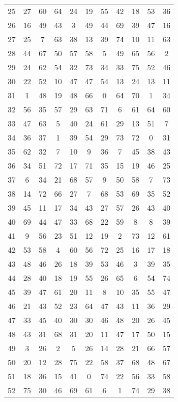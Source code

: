 \begin{table}
\begin{tabular}{c c c c c c c c c c c }
25 & 27 & 60 & 64 & 24 & 19 & 55 & 42 & 18 & 53 & 36 \\
26 & 16 & 49 & 43 & 3 & 49 & 44 & 69 & 39 & 47 & 16 \\
27 & 25 & 7 & 63 & 38 & 13 & 39 & 74 & 10 & 11 & 63 \\
28 & 44 & 67 & 50 & 57 & 58 & 5 & 49 & 65 & 56 & 2 \\
29 & 24 & 62 & 54 & 32 & 73 & 34 & 33 & 75 & 52 & 46 \\
30 & 22 & 52 & 10 & 47 & 47 & 54 & 13 & 24 & 13 & 11 \\
31 & 1 & 48 & 19 & 48 & 66 & 0 & 64 & 70 & 1 & 34 \\
32 & 56 & 35 & 57 & 29 & 63 & 71 & 6 & 61 & 64 & 60 \\
33 & 47 & 63 & 5 & 40 & 24 & 61 & 29 & 13 & 51 & 7 \\
34 & 36 & 37 & 1 & 39 & 54 & 29 & 73 & 72 & 0 & 31 \\
35 & 62 & 32 & 7 & 10 & 9 & 36 & 7 & 45 & 38 & 43 \\
36 & 34 & 51 & 72 & 17 & 71 & 35 & 15 & 19 & 46 & 25 \\
37 & 6 & 34 & 21 & 68 & 57 & 9 & 50 & 58 & 7 & 73 \\
38 & 14 & 72 & 66 & 27 & 7 & 68 & 53 & 69 & 35 & 52 \\
39 & 45 & 11 & 17 & 34 & 43 & 27 & 57 & 26 & 43 & 40 \\
40 & 69 & 44 & 47 & 33 & 68 & 22 & 59 & 8 & 8 & 39 \\
41 & 9 & 56 & 23 & 51 & 12 & 19 & 2 & 73 & 12 & 61 \\
42 & 53 & 58 & 4 & 60 & 56 & 72 & 25 & 16 & 17 & 18 \\
43 & 48 & 46 & 26 & 18 & 39 & 53 & 46 & 3 & 39 & 35 \\
44 & 28 & 40 & 18 & 19 & 55 & 26 & 65 & 6 & 54 & 74 \\
45 & 39 & 47 & 61 & 20 & 11 & 8 & 10 & 35 & 55 & 47 \\
46 & 21 & 43 & 52 & 23 & 64 & 47 & 43 & 11 & 36 & 29 \\
47 & 33 & 45 & 40 & 30 & 30 & 46 & 48 & 20 & 26 & 45 \\
48 & 43 & 31 & 68 & 31 & 20 & 11 & 47 & 17 & 50 & 15 \\
49 & 3 & 26 & 2 & 5 & 26 & 14 & 28 & 21 & 66 & 57 \\
50 & 20 & 12 & 28 & 75 & 22 & 58 & 37 & 68 & 48 & 67 \\
51 & 18 & 36 & 15 & 41 & 0 & 74 & 22 & 56 & 33 & 58 \\
52 & 75 & 30 & 46 & 69 & 61 & 6 & 1 & 74 & 29 & 38 \\

\end{tabular}
\end{table}
